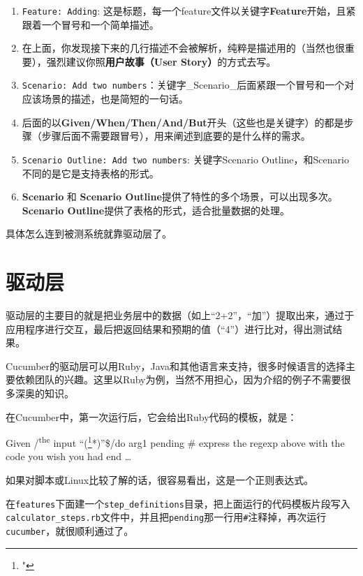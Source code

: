 \begin{enumerate}
\item \texttt{Feature: Adding}: 这是标题，每一个feature文件以关键字\textbf{Feature}开始，且紧跟着一个冒号和一个简单描述。

\item 在上面，你发现接下来的几行描述不会被解析，纯粹是描述用的（当然也很重要），强烈建议你照\textbf{用户故事（User Story）}的方式去写。

\item \texttt{Scenario: Add two numbers}：关键字\_Scenario\_后面紧跟一个冒号和一个对应该场景的描述，也是简短的一句话。

\item 后面的以\textbf{Given\slash When\slash Then\slash And\slash But}开头（这些也是关键字）的都是步骤（步骤后面不需要跟冒号），用来阐述到底要的是什么样的需求。

\item \texttt{Scenario Outline: Add two numbers}: 关键字Scenario Outline，和Scenario不同的是它是支持表格的形式。

\item \textbf{Scenario} 和 \textbf{Scenario Outline}提供了特性的多个场景，可以出现多次。\textbf{Scenario Outline}提供了表格的形式，适合批量数据的处理。

\end{enumerate}

具体怎么连到被测系统就靠驱动层了。

\section{驱动层}
\label{驱动层}

驱动层的主要目的就是把业务层中的数据（如上“2+2”，“加”）提取出来，通过于应用程序进行交互，最后把返回结果和预期的值（“4”）进行比对，得出测试结果。

Cucumber的驱动层可以用Ruby，Java和其他语言来支持，很多时候语言的选择主要依赖团队的兴趣。这里以Ruby为例，当然不用担心，因为介绍的例子不需要很多深奥的知识。

在Cucumber中，第一次运行后，它会给出Ruby代码的模板，就是：

Given \slash \textsuperscript{the} input ``(\footnote{"}*)''\$\slash  do \textbar{}arg1\textbar{}
 pending \# express the regexp above with the code you wish you had
 end
 {\ldots}

如果对脚本或Linux比较了解的话，很容易看出，这是一个正则表达式。

在\texttt{features}下面建一个\texttt{step\_definitions}目录，把上面运行的代码模板片段写入\texttt{calculator\_steps.rb}文件中，并且把\texttt{pending}那一行用\texttt{\#}注释掉，再次运行\texttt{cucumber}，就很顺利通过了。

